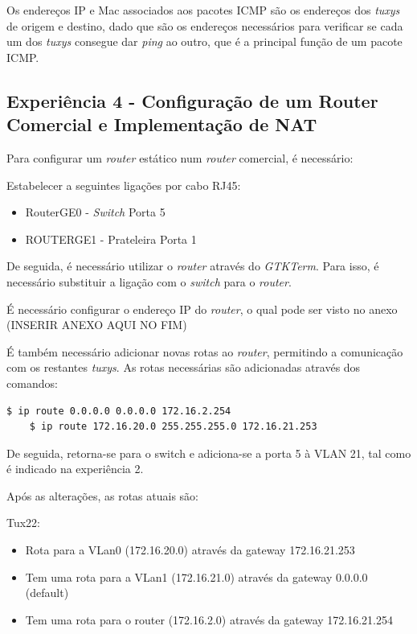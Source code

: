 \documentclass[11pt]{article}
\begin{document}
Os endereços IP e Mac associados aos pacotes ICMP são os endereços dos \textit{tuxys} de origem e destino, dado que são os endereços necessários para verificar se cada um dos \textit{tuxys} consegue dar \textit{ping} ao outro, que é a principal função de um pacote ICMP. 

\subsection{Experiência 4 - Configuração de um Router Comercial e Implementação de NAT}

Para configurar um \textit{router} estático num \textit{router} comercial, é necessário:

Estabelecer a seguintes ligações por cabo RJ45:
\begin{itemize}
\item RouterGE0 - \textit{Switch} Porta 5
\item ROUTERGE1 - Prateleira Porta 1  
\end{itemize}

De seguida, é necessário utilizar o \textit{router} através do \textit{GTKTerm}. Para isso, é necessário substituir a ligação com o \textit{switch} para o \textit{router}.

É necessário configurar o endereço IP do \textit{router}, o qual pode ser visto no anexo (INSERIR ANEXO AQUI NO FIM)

É também necessário adicionar novas rotas ao \textit{router}, permitindo a comunicação com os restantes \textit{tuxys}. As rotas necessárias são adicionadas através dos comandos:
\begin{lstlisting}[language=bash]
    $ ip route 0.0.0.0 0.0.0.0 172.16.2.254
    $ ip route 172.16.20.0 255.255.255.0 172.16.21.253
\end{lstlisting}

De seguida, retorna-se para o switch e adiciona-se a porta 5 à VLAN 21, tal como é indicado na experiência 2.


Após as alterações, as rotas atuais são:

Tux22:
\begin{itemize}
\item Rota para a VLan0 (172.16.20.0) através da gateway 172.16.21.253
\item Tem uma rota para a VLan1 (172.16.21.0) através da gateway 0.0.0.0 (default)
\item Tem uma rota para o router (172.16.2.0) através da gateway 172.16.21.254
\end{itemize}
\end{document}
